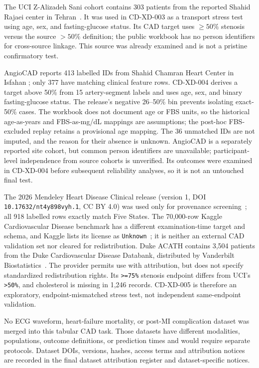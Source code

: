 \documentclass[12pt]{article}
\begin{document}
The UCI Z-Alizadeh Sani cohort contains 303 patients from the reported Shahid
Rajaei center in Tehran~\cite{alizadehsani2013cad,uciz}. It was used in
CD-XD-003 as a transport stress test using age, sex, and fasting-glucose
status. Its CAD target uses \(\geq50\%\) stenosis versus the source
\(>50\%\) definition; the public workbook has no person identifiers for
cross-source linkage. This source was already examined and is not a pristine
confirmatory test.

AngioCAD reports 413 labelled IDs from Shahid Chamran Heart Center in Isfahan
\cite{angiocad2026,angiocadzenodo2025}; only 377 have matching clinical
feature rows. CD-XD-004 derives a target above 50\% from 15 artery-segment
labels and uses age, sex, and binary fasting-glucose status. The release's
negative 26--50\% bin prevents isolating exact-50\% cases. The workbook does
not document age or FBS units, so the historical age-as-years and FBS-as-mg/dL
mappings are assumptions; the post-hoc FBS-excluded replay retains a
provisional age mapping. The 36 unmatched IDs are not imputed, and the reason
for their absence is unknown. AngioCAD is a separately reported site cohort,
but common person identifiers are unavailable; participant-level
independence from source cohorts is unverified. Its outcomes were examined in
CD-XD-004 before subsequent reliability analyses, so it is not an untouched
final test.

The 2026 Mendeley Heart Disease Clinical release (version 1, DOI
\texttt{10.17632/nt4y898vyh.1}, CC BY 4.0) was used only for provenance
screening~\cite{mendeleyheart2026};
all 918 labelled rows exactly match Five States. The 70,000-row Kaggle
Cardiovascular Disease benchmark has a different examination-time target and
schema, and Kaggle lists its license as \texttt{Unknown}~\cite{kagglecardio70k}; it is neither an external
CAD validation set nor cleared for redistribution. Duke ACATH contains 3,504
patients from the Duke Cardiovascular Disease Databank, distributed by
Vanderbilt Biostatistics~\cite{dukeacath2026}. The provider permits use with
attribution, but does not specify standardized redistribution rights. Its
\texttt{>=75\%} stenosis endpoint differs from UCI's \texttt{>50\%}, and
cholesterol is missing in 1,246 records. CD-XD-005 is therefore an
exploratory, endpoint-mismatched stress test, not independent same-endpoint
validation.

No ECG waveform, heart-failure mortality, or post-MI complication dataset was
merged into this tabular CAD task. Those datasets have different modalities,
populations, outcome definitions, or prediction times and would require
separate protocols. Dataset DOIs, versions, hashes, access terms and
attribution notices are recorded in the final dataset attribution register
and dataset-specific notices.
\end{document}
